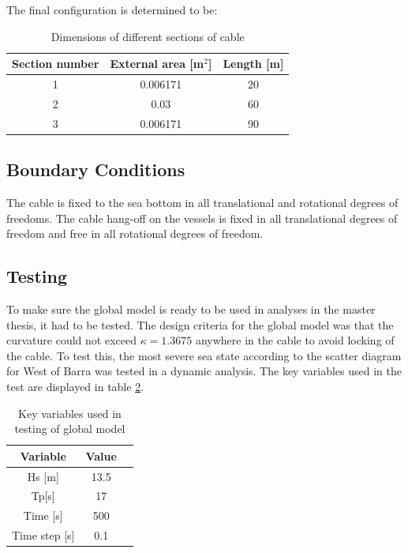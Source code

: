 \noindent The final configuration is determined to be: 
\begin{table} [H]
\centering
\begin{tabular}{ |c|c|c|}
\hline
Section number & External area [m$^2$] & Length [m] \\
 \hline
 \hline
1 & 0.006171 & 20\\
2 & 0.03 & 60\\
3 & 0.006171 & 90\\
 \hline
\end{tabular}
\caption{Dimensions of different sections of cable}
\label{table:DIMCABLE}
\end{table}

\subsection{Boundary Conditions}
The cable is fixed to the sea bottom in all translational and rotational degrees of freedoms. The cable hang-off on the vessels is fixed in all translational degrees of freedom and free in all rotational degrees of freedom. 

\subsection{Testing}
To make sure the global model is ready to be used in analyses in the master thesis, it had to be tested. The design criteria for the global model was that the curvature could not exceed $\kappa=1.3675$ anywhere in the cable to avoid locking of the cable. To test this, the most severe sea state according to the scatter diagram for West of Barra was tested in a dynamic analysis. The key variables used in the test are displayed in table \ref{table:testglob}.

\begin{table} [H]
\centering
\begin{tabular}{ |c|c|c|}
\hline
Variable & Value \\
 \hline
 \hline
Hs [m] & 13.5\\
Tp[s] & 17 \\
Time [s] & 500 \\
Time step [s] & 0.1 \\
 \hline
\end{tabular}
\caption{Key variables used in testing of global model}
\label{table:testglob}
\end{table}

